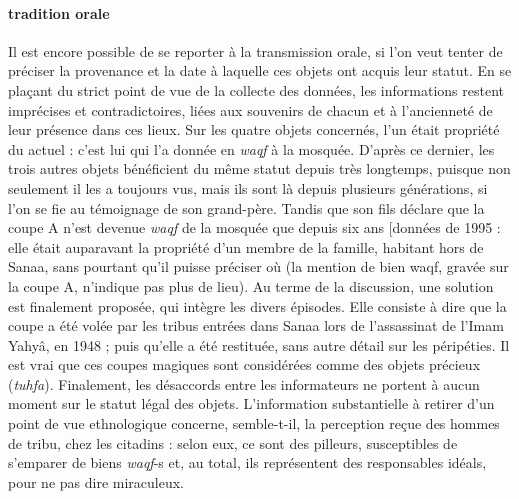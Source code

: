 \paragraph{tradition orale}
Il est encore possible de se reporter à la transmission orale, si l'on veut tenter de préciser la provenance et la date à laquelle ces objets ont acquis leur statut. En se plaçant du strict point de vue de la collecte des données, les informations restent imprécises et contradictoires, liées aux souvenirs de chacun et à l'ancienneté de leur présence dans ces lieux. Sur les quatre objets concernés, l'un était propriété du  actuel : c'est lui qui l'a donnée en \textit{waqf} à la mosquée. D'après ce dernier, les trois autres objets bénéficient du même statut depuis très longtemps, puisque non seulement il les a toujours vus, mais ils sont là depuis plusieurs générations, si l'on se fie au témoignage de son grand-père. Tandis que son fils déclare que la 
coupe A n'est devenue \textit{waqf} de la mosquée que depuis six ans [données de 1995 : elle était auparavant la propriété d'un membre de la famille, habitant hors de Sanaa, sans pourtant qu'il puisse préciser où (la mention de bien waqf, gravée sur la coupe A, n'indique pas plus de lieu). Au terme de la discussion, une solution est finalement proposée, qui intègre les divers épisodes. Elle consiste à dire que la coupe a été volée par les tribus entrées dans Sanaa lors de l'assassinat de l'Imam Yahyâ, en 1948  ; puis qu'elle a été restituée, sans autre détail sur les péripéties. Il est vrai que ces coupes magiques sont considérées comme des objets précieux (\textit{tuhfa}).
Finalement, les désaccords entre les informateurs ne portent à aucun moment sur le statut légal des objets. L'information substantielle à retirer d'un point de vue ethnologique concerne, semble-t-il, la perception reçue des hommes de tribu, chez les citadins : selon eux, ce sont des pilleurs, susceptibles de s'emparer de biens \textit{waqf}-s et, au total, ils représentent des responsables idéals, pour ne pas dire miraculeux.

